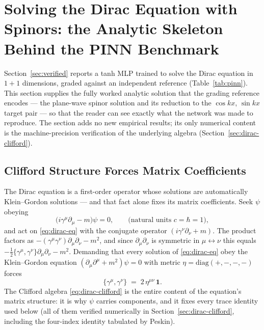 \section{Solving the Dirac Equation with Spinors: the Analytic Skeleton
Behind the PINN Benchmark}
\label{sec:dirac-spinors}

Section~\ref{sec:verified} reports a tanh MLP trained to solve the Dirac
equation in $1+1$ dimensions, graded against an independent reference
(Table~\ref{tab:pinn}). This section supplies the fully worked analytic
solution that the grading reference encodes --- the plane-wave spinor
solution and its reduction to the $\cos kx$, $\sin kx$ target pair --- so
that the reader can see exactly what the network was made to reproduce.
The section adds no new empirical results; its only numerical
content is the machine-precision verification of the underlying algebra
(Section~\ref{sec:dirac-clifford}).

\subsection{Clifford Structure Forces Matrix Coefficients}
\label{sec:dirac-clifford-forcing}

The Dirac equation is a first-order operator whose solutions are
automatically Klein--Gordon solutions --- and that fact alone fixes its
matrix coefficients. Seek $\psi$ obeying
\begin{equation}
\bigl(i\gamma^{\mu}\partial_{\mu} - m\bigr)\psi = 0,
\qquad
\text{(natural units } c = \hbar = 1),
\label{eq:dirac-eq}
\end{equation}
and act on \eqref{eq:dirac-eq} with the conjugate operator
$(i\gamma^{\nu}\partial_{\nu} + m)$. The product factors as
$-(\gamma^{\mu}\gamma^{\nu})\partial_{\mu}\partial_{\nu} - m^{2}$, and since
$\partial_{\mu}\partial_{\nu}$ is symmetric in $\mu \leftrightarrow \nu$
this equals $-\tfrac{1}{2}\{\gamma^{\mu},\gamma^{\nu}\}\partial_{\mu}
\partial_{\nu} - m^{2}$. Demanding that every solution of
\eqref{eq:dirac-eq} obey the Klein--Gordon equation
$(\partial_{\mu}\partial^{\mu} + m^{2})\psi = 0$ with metric
$\eta = \mathrm{diag}(+,-,-,-)$ forces
\begin{equation}
\{\gamma^{\mu}, \gamma^{\nu}\} \;=\; 2\,\eta^{\mu\nu}\,\mathbf{1}.
\label{eq:dirac-clifford}
\end{equation}
The Clifford algebra \eqref{eq:dirac-clifford} is the entire content of the
equation's matrix structure: it is why $\psi$ carries components, and it
fixes every trace identity used below (all of them verified numerically in
Section~\ref{sec:dirac-clifford}, including the four-index identity tabulated
by Peskin).

